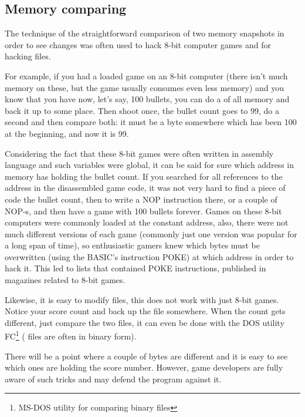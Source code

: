 \subsection{Memory  comparing}
\label{snapshots_comparing}

The technique of the straightforward comparison of two memory snapshots in order to see changes was often used to hack
8-bit computer games and for hacking  files.

For example, if you had a loaded game on an 8-bit computer (there isn't much memory on these, but the game usually
consumes even less memory) and you know that you have now, let's say, 100 bullets, you can do a 
of all memory and back it up to some place. Then shoot once, the bullet count goes to 99, do a second 
and then compare both: it must be a byte somewhere which has been 100 at the beginning, and now it is 99.

Considering the fact that these 8-bit games were often written in assembly language and such variables were global,
it can be said for sure which address in memory has holding the bullet count. If you searched for all references to the
address in the disassembled game code, it was not very hard to find a piece of code  the bullet count,
then to write a \gls{NOP} instruction there, or a couple of \gls{NOP}-s, 
and then have a game with 100 bullets forever.
Games on these 8-bit computers were commonly loaded at the constant
address, also, there were not much different versions of each game (commonly just one version was popular for a long span of time),
so enthusiastic gamers knew which bytes must be overwritten (using the BASIC's instruction \gls{POKE}) at which address in
order to hack it. This led to  lists that contained \gls{POKE} instructions, published in magazines related to
8-bit games.


Likewise, it is easy to modify  files, this does not work with just 8-bit games. Notice 
your score count and back up the file somewhere. When the  count gets different, just compare the two files,
it can even be done with the DOS utility FC\footnote{MS-DOS utility for comparing binary files} ( files
are often in binary form).

There will be a point where a couple of bytes are different and it is easy to see which ones are
holding the score number.
However, game developers are fully aware of such tricks and may defend the program against it.

